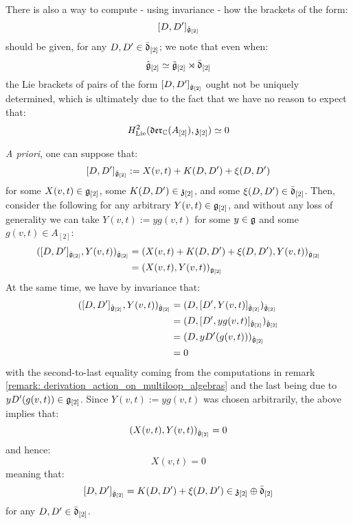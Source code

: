             \begin{remark} \label{remark: dual_of_toroidal_centres_contains_derivations}
                There is also a way to compute - using invariance - how the brackets of the form:
                    $$[D, D']_{\hat{\mathfrak{g}}_{[2]}}$$
                should be given, for any $D, D' \in \bar{\mathfrak{d}}_{[2]}$; we note that even when:
                    $$\hat{\mathfrak{g}}_{[2]} \simeq \tilde{\mathfrak{g}}_{[2]} \rtimes \bar{\mathfrak{d}}_{[2]}$$
                the Lie brackets of pairs of the form $[D, D']_{\hat{\mathfrak{g}}_{[2]}}$ ought not be uniquely determined, which is ultimately due to the fact that we have no reason to expect that:
                    $$H^2_{\mathrm{Lie}}(\mathfrak{der}_{\mathbb{C}}(A_{[2]}), \mathfrak{z}_{[2]}) \simeq 0$$
                    
                \textit{A priori}, one can suppose that:
                    $$[D, D']_{\hat{\mathfrak{g}}_{[2]}} := X(v, t) + K(D, D') + \xi(D, D')$$
                for some $X(v, t) \in \mathfrak{g}_{[2]}$, some $K(D, D') \in \mathfrak{z}_{[2]}$, and some $\xi(D, D') \in \bar{\mathfrak{d}}_{[2]}$. Then, consider the following for any arbitrary $Y(v, t) \in \mathfrak{g}_{[2]}$, and without any loss of generality we can take $Y(v, t) := y g(v, t)$ for some $y \in \mathfrak{g}$ and some $g(v, t) \in A_{[2]}$:
                    $$
                        \begin{aligned}
                            ( [D, D']_{\hat{\mathfrak{g}}_{[2]}}, Y(v, t) )_{\hat{\mathfrak{g}}_{[2]}} & = ( X(v, t) + K(D, D') + \xi(D, D'), Y(v, t) )_{\hat{\mathfrak{g}}_{[2]}}
                            \\
                            & = (X(v, t), Y(v, t))_{\mathfrak{g}_{[2]}}
                        \end{aligned}
                    $$
                At the same time, we have by invariance that:
                    $$
                        \begin{aligned}
                            ( [D, D']_{\hat{\mathfrak{g}}_{[2]}}, Y(v, t) )_{\hat{\mathfrak{g}}_{[2]}} & = ( D, [D', Y(v, t)]_{\hat{\mathfrak{g}}_{[2]}} )_{\hat{\mathfrak{g}}_{[2]}}
                            \\
                            & = ( D, [D', y g(v, t)]_{\hat{\mathfrak{g}}_{[2]}} )_{\hat{\mathfrak{g}}_{[2]}}
                            \\
                            & = ( D, y D'(g(v, t)) )_{\hat{\mathfrak{g}}_{[2]}}
                            \\
                            & = 0
                        \end{aligned}
                    $$
                with the second-to-last equality coming from the computations in remark \ref{remark: derivation_action_on_multiloop_algebras} and the last being due to $y D'(g(v, t)) \in \mathfrak{g}_{[2]}$. Since $Y(v, t) := y g(v, t)$ was chosen arbitrarily, the above implies that:
                    $$(X(v, t), Y(v, t))_{\hat{\mathfrak{g}}_{[2]}} = 0$$
                and hence:
                    $$X(v, t) = 0$$
                meaning that:
                    $$[D, D']_{\hat{\mathfrak{g}}_{[2]}} = K(D, D') + \xi(D, D') \in \mathfrak{z}_{[2]} \oplus \bar{\mathfrak{d}}_{[2]}$$
                for any $D, D' \in \bar{\mathfrak{d}}_{[2]}$. 
                

\end{remark}

